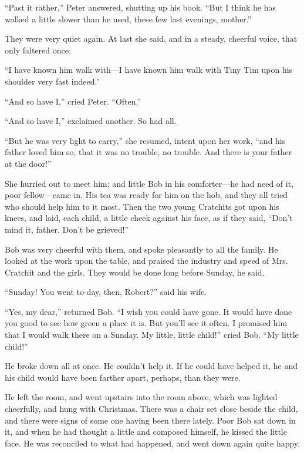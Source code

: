\documentclass[paper=a5,BCOR=15mm,twoside,DIV=15,headinclude=off,12pt,chapterprefix=off,openany,headings=huge]{scrbook} %
\begin{document}
\enquote{Past it rather,} Peter answered, shutting up his book. \enquote{But I think he has walked a little slower than he used, these few last evenings, mother.}

They were very quiet again. At last she said, and in a steady, cheerful voice, that only faltered once:

\enquote{I have known him walk with—I have known him walk with Tiny Tim upon his shoulder very fast indeed.}

\enquote{And so have I,} cried Peter. \enquote{Often.}

\enquote{And so have I,} exclaimed another. So had all.

\enquote{But he was very light to carry,} she resumed, intent upon her work, \enquote{and his father loved him so, that it was no trouble, no trouble. And there is your father at the door!}

She hurried out to meet him; and little Bob in his comforter—he had need of it, poor fellow—came in. His tea was ready for him on the hob, and they all tried who should help him to it most. Then the two young Cratchits got upon his knees, and laid, each child, a little cheek against his face, as if they said, \enquote{Don't mind it, father. Don't be grieved!}

Bob was very cheerful with them, and spoke pleasantly to all the family. He looked at the work upon the table, and praised the industry and speed of Mrs. Cratchit and the girls. They would be done long before Sunday, he said.

\enquote{Sunday! You went to-day, then, Robert?} said his wife.

\enquote{Yes, my dear,} returned Bob. \enquote{I wish you could have gone. It would have done you good to see how green a place it is. But you'll see it often. I promised him that I would walk there on a Sunday. My little, little child!} cried Bob. \enquote{My little child!}

He broke down all at once. He couldn't help it. If he could have helped it, he and his child would have been farther apart, perhaps, than they were.

He left the room, and went upstairs into the room above, which was lighted cheerfully, and hung with Christmas. There was a chair set close beside the child, and there were signs of some one having been there lately. Poor Bob sat down in it, and when he had thought a little and composed himself, he kissed the little face. He was reconciled to what had happened, and went down again quite happy.
\end{document}
